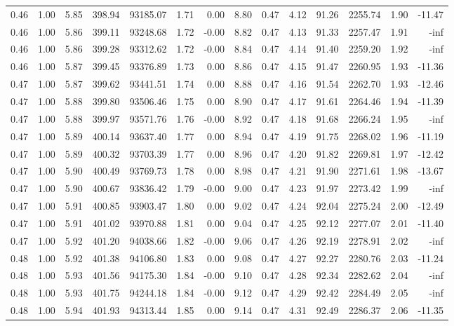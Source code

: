 \begin{table}[!ht]
\begin{tabular}{rrrrrrrrrrrrrr}
0.46 & 1.00 & 5.85 & 398.94 & 93185.07 & 1.71 & 0.00 & 8.80 & 0.47 & 4.12 & 91.26 & 2255.74 & 1.90 & -11.47 \\
0.46 & 1.00 & 5.86 & 399.11 & 93248.68 & 1.72 & -0.00 & 8.82 & 0.47 & 4.13 & 91.33 & 2257.47 & 1.91 & -inf \\
0.46 & 1.00 & 5.86 & 399.28 & 93312.62 & 1.72 & -0.00 & 8.84 & 0.47 & 4.14 & 91.40 & 2259.20 & 1.92 & -inf \\
0.46 & 1.00 & 5.87 & 399.45 & 93376.89 & 1.73 & 0.00 & 8.86 & 0.47 & 4.15 & 91.47 & 2260.95 & 1.93 & -11.36 \\
0.47 & 1.00 & 5.87 & 399.62 & 93441.51 & 1.74 & 0.00 & 8.88 & 0.47 & 4.16 & 91.54 & 2262.70 & 1.93 & -12.46 \\
0.47 & 1.00 & 5.88 & 399.80 & 93506.46 & 1.75 & 0.00 & 8.90 & 0.47 & 4.17 & 91.61 & 2264.46 & 1.94 & -11.39 \\
0.47 & 1.00 & 5.88 & 399.97 & 93571.76 & 1.76 & -0.00 & 8.92 & 0.47 & 4.18 & 91.68 & 2266.24 & 1.95 & -inf \\
0.47 & 1.00 & 5.89 & 400.14 & 93637.40 & 1.77 & 0.00 & 8.94 & 0.47 & 4.19 & 91.75 & 2268.02 & 1.96 & -11.19 \\
0.47 & 1.00 & 5.89 & 400.32 & 93703.39 & 1.77 & 0.00 & 8.96 & 0.47 & 4.20 & 91.82 & 2269.81 & 1.97 & -12.42 \\
0.47 & 1.00 & 5.90 & 400.49 & 93769.73 & 1.78 & 0.00 & 8.98 & 0.47 & 4.21 & 91.90 & 2271.61 & 1.98 & -13.67 \\
0.47 & 1.00 & 5.90 & 400.67 & 93836.42 & 1.79 & -0.00 & 9.00 & 0.47 & 4.23 & 91.97 & 2273.42 & 1.99 & -inf \\
0.47 & 1.00 & 5.91 & 400.85 & 93903.47 & 1.80 & 0.00 & 9.02 & 0.47 & 4.24 & 92.04 & 2275.24 & 2.00 & -12.49 \\
0.47 & 1.00 & 5.91 & 401.02 & 93970.88 & 1.81 & 0.00 & 9.04 & 0.47 & 4.25 & 92.12 & 2277.07 & 2.01 & -11.40 \\
0.47 & 1.00 & 5.92 & 401.20 & 94038.66 & 1.82 & -0.00 & 9.06 & 0.47 & 4.26 & 92.19 & 2278.91 & 2.02 & -inf \\
0.48 & 1.00 & 5.92 & 401.38 & 94106.80 & 1.83 & 0.00 & 9.08 & 0.47 & 4.27 & 92.27 & 2280.76 & 2.03 & -11.24 \\
0.48 & 1.00 & 5.93 & 401.56 & 94175.30 & 1.84 & -0.00 & 9.10 & 0.47 & 4.28 & 92.34 & 2282.62 & 2.04 & -inf \\
0.48 & 1.00 & 5.93 & 401.75 & 94244.18 & 1.84 & -0.00 & 9.12 & 0.47 & 4.29 & 92.42 & 2284.49 & 2.05 & -inf \\
0.48 & 1.00 & 5.94 & 401.93 & 94313.44 & 1.85 & 0.00 & 9.14 & 0.47 & 4.31 & 92.49 & 2286.37 & 2.06 & -11.35 \\

\end{tabular}
\end{table}
